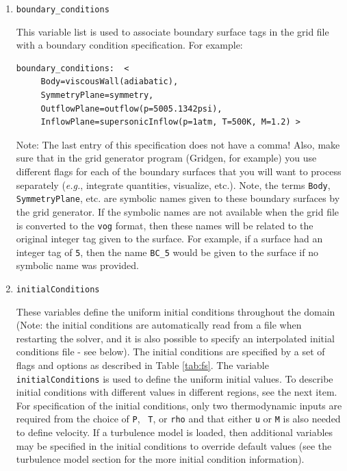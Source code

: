 \documentclass{article}
\begin{document}
\begin{enumerate}
 
\item {\tt boundary\_conditions}

This variable list is used to associate boundary surface tags in 
the grid file with a boundary condition specification.  For example:
\begin{verbatim}
boundary_conditions:  <
     Body=viscousWall(adiabatic),
     SymmetryPlane=symmetry,
     OutflowPlane=outflow(p=5005.1342psi),
     InflowPlane=supersonicInflow(p=1atm, T=500K, M=1.2) >
\end{verbatim}
Note: The last entry of this specification does not have a comma!
Also, make sure that in the grid generator program (Gridgen, for
example) you use different flags for each of the boundary surfaces
that you will want to process separately ({\it e.g.}, integrate
quantities, visualize, etc.).  Note, the terms {\tt Body}, {\tt
  SymmetryPlane}, etc.  are symbolic names given to these boundary
surfaces by the grid generator.  If the symbolic names are not
available when the grid file is converted to the {\tt vog} format,
then these names will be related to the original integer tag given to
the surface.  For example, if a surface had an integer tag of {\tt 5},
then the name {\tt BC\_5} would be given to the surface if no symbolic
name was provided.

\item {\tt initialConditions} 

  These variables define the uniform initial conditions throughout the
  domain (Note: the initial conditions are automatically read from a
  file when restarting the solver, and it is also possible to specify
  an interpolated initial conditions file - see below).  The initial
  conditions are specified by a set of flags and options as described
  in Table \ref{tab:fs}.  The variable {\tt initialConditions} is used
  to define the uniform initial values.  To describe initial
  conditions with different values in different regions, see the next
  item.  For specification of the initial conditions, only two
  thermodynamic inputs are required from the choice of {\tt P}, {\tt
    T}, or {\tt rho} and that either {\tt u} or {\tt M} is also needed
  to define velocity.  If a turbulence model is loaded, then
  additional variables may be specified in the initial conditions to
  override default values (see the turbulence model section for the
  more initial condition information).

\begin{table}[htbp]


\end{table}
\end{enumerate}
\end{document}
